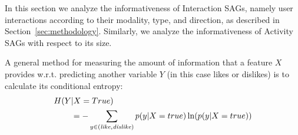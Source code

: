                 

In this section we analyze the informativeness of Interaction SAGs,
namely user interactions according to their modality, type, and direction, 
as described in Section~\ref{sec:methodology}. Similarly, we analyze the 
informativeness of Activity SAGs with respect to its size.

A general method for measuring the amount of information that a 
feature $X$ provides w.r.t. predicting another variable $Y$ (in this
case likes or dislikes) is to calculate its conditional entropy:
\begin{align*}
H(Y&|X=True)\\
& = -\sum_{y\in{(\like,\dislike)}} p(y|X=true) \ln( p(y|X=true))
\end{align*}

